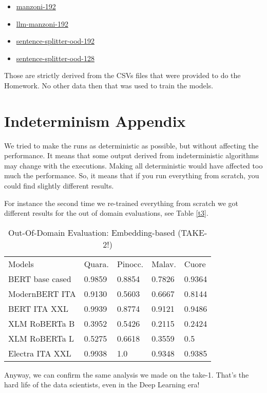 \documentclass[11pt]{article}
\begin{document}
\begin{itemize}
	\item \href{https://huggingface.co/datasets/fax4ever/manzoni-192}{manzoni-192}
	\item \href{https://huggingface.co/datasets/fax4ever/llm-manzoni-192}{llm-manzoni-192}
    \item \href{https://huggingface.co/datasets/fax4ever/sentence-splitter-ood-192}{sentence-splitter-ood-192}
    \item \href{https://huggingface.co/datasets/fax4ever/sentence-splitter-ood-128}{sentence-splitter-ood-128}
\end{itemize}

Those are strictly derived from the CSVs files that were provided to do the Homework.
No other data then that was used to train the models.

\section{Indeterminism Appendix}
\label{sec:appendix3}

We tried to make the runs as deterministic as possible, but without affecting the
performance.
It means that some output derived from indeterministic algorithms may change with the executions.
Making all deterministic would have affected too much the performance.
So, it means that if you run everything from scratch, you could find slightly different results.

For instance the second time we re-trained everything from scratch we got different results
for the out of domain evaluations, see Table \ref{t3}.

\begin{table}[]
	\small
	\caption{Out-Of-Domain Evaluation: Embedding-based (TAKE-2!)}
	\begin{tabular}{lllll}
		Models & Quara. & Pinocc. & Malav. & Cuore \\
		BERT base cased & 0.9859      & 0.8854 & 0.7826        & 0.9364                 \\
		ModernBERT ITA  & 0.9130     & 0.5603   & 0.6667   & 0.8144                 \\
		BERT ITA XXL  & 0.9939     & 0.8774  & 0.9121     & 0.9486                 \\
		XLM RoBERTa B & 0.3952      & 0.5426   & 0.2115     & 0.2424                 \\
		XLM RoBERTa L & 0.5275       & 0.6618    & 0.3559   & 0.5               \\
		Electra ITA XXL  & 0.9938      & 1.0   & 0.9348    & 0.9385            
	\end{tabular}
	\label{t4}
\end{table}

Anyway, we can confirm the same analysis we made on the take-1.
That's the hard life of the data scientists, even in the Deep Learning era!


\end{document}
